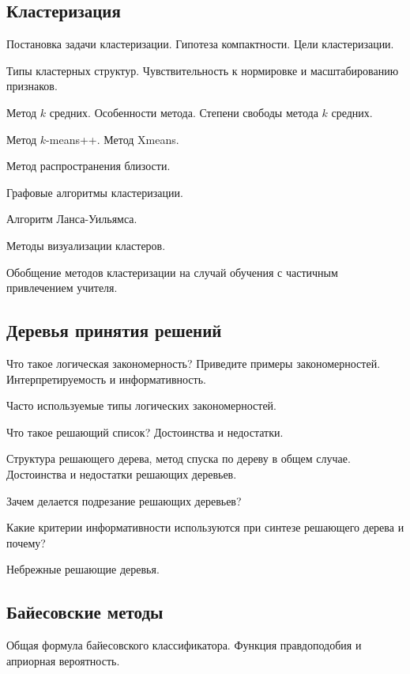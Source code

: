\documentclass[a4paper,12pt]{article}
\begin{document}
  \subsection*{Кластеризация}  
  
  \myparagraph Постановка задачи кластеризации. Гипотеза компактности. Цели кластеризации.
  
  \myparagraph Типы кластерных структур. Чувствительность к нормировке и масштабированию признаков.
  
  \myparagraph Метод $k$ средних. Особенности метода. Степени свободы метода $k$ средних.
  
  \myparagraph Метод $k$-means++. Метод Xmeans. 

  \myparagraph Метод распространения близости.
  
  \myparagraph Графовые алгоритмы кластеризации.
  
  \myparagraph Алгоритм Ланса-Уильямса.
  
  \myparagraph Методы визуализации кластеров.
  
  \myparagraph Обобщение методов кластеризации на случай обучения с частичным привлечением учителя.

  \subsection*{Деревья принятия решений}  

  \myparagraph Что такое логическая закономерность? Приведите примеры закономерностей. Интерпретируемость и информативность.

  \myparagraph Часто используемые типы логических закономерностей.

  \myparagraph Что такое решающий список? Достоинства и недостатки.
  
  \myparagraph Структура решающего дерева, метод спуска по дереву в общем случае. Достоинства и недостатки решающих деревьев.

  \myparagraph Зачем делается подрезание решающих деревьев?
  
  \myparagraph Какие критерии информативности используются при синтезе решающего дерева и почему?   

  \myparagraph Небрежные решающие деревья.
    
  \subsection*{Байесовские методы}
  
  \myparagraph Общая формула байесовского классификатора. Функция правдоподобия и априорная вероятность.
  
\end{document}
